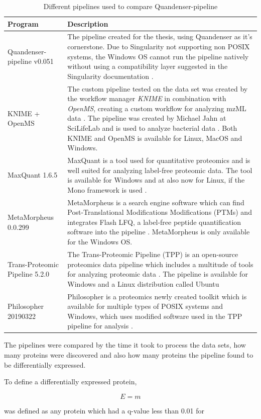 \newcommand{\textone}{\small The pipeline created for the thesis, using Quandenser as it's cornerstone. Due to Singularity not supporting non POSIX systems, the Windows OS cannot run the pipeline natively without using a compatibility layer suggested in the Singularity documentation \cite{singularity-documentation}.}
\newcommand{\texttwo}{\small The custom pipeline tested on the data set was created by the workflow manager \textit{KNIME} in combination with \textit{OpenMS}, creating a custom workflow for analyzing mzML data \cite{knime} \cite{openms}. The pipeline was created by Michael Jahn at SciLifeLab and is used to analyze bacterial data \cite{m-jahn-pipeline}. Both KNIME and OpenMS is available for Linux, MacOS and Windows.}
\newcommand{\textthree}{\small MaxQuant is a tool used for quantitative proteomics and is well suited for analyzing label-free proteomic data. The tool is available for Windows and at also now for Linux, if the Mono framework is used \cite{maxquant} \cite{maxquant-installation}.}
\newcommand{\textfour}{\small MetaMorpheus is a search engine software which can find Post-Translational Modifications Modifications (PTMs) and integrates Flash LFQ, a label-free peptide quantification software into the pipeline \cite{metamorpheus}. MetaMorpheus is only available for the Windows OS.}
\newcommand{\textfive}{\small The Trans-Proteomic Pipeline (TPP) is an open-source proteomics data pipeline which includes a multitude of tools for analyzing proteomic data \cite{TPP}. The pipeline is available for Windows and a Linux distribution called Ubuntu}
\newcommand{\textsix}{\small Philosopher is a proteomics newly created toolkit which is available for multiple types of POSIX systems and Windows, which uses modified software used in the TPP pipeline for analysis \cite{philosopher}.}

\begin{table}[H]
\begin{tabular}{|p{4cm}|p{9cm}|}
\hline
Program & Description \\ \hline \hline
Quandenser-pipeline v0.051 & \textone \\ \hline
KNIME + OpenMS & \texttwo \\ \hline
MaxQuant 1.6.5 & \textthree \\ \hline
MetaMorpheus 0.0.299 & \textfour \\ \hline
Trans-Proteomic Pipeline 5.2.0 & \textfive \\ \hline
Philosopher 20190322 & \textsix \\ \hline
\end{tabular}
\caption{Different pipelines used to compare Quandenser-pipeline}
\end{table}

The pipelines were compared by the time it took to process the data sets, how many proteins were discovered and also how many proteins the pipeline found to be differentially expressed.

To define a differentially expressed protein,


\begin{equation}
E=m
\end{equation}


was defined as any protein which had a q-value less than 0.01 for
